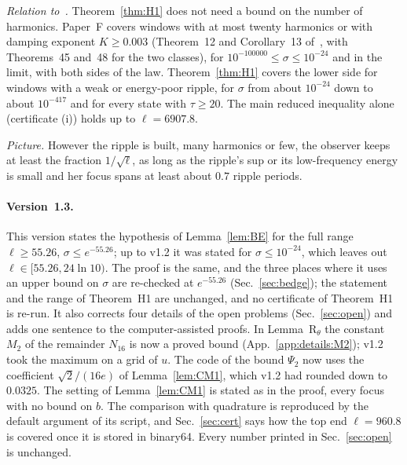 \emph{Relation to~\cite{F}.}
Theorem~\ref{thm:H1} does not need a bound on the number of harmonics.
Paper~F covers windows with at most twenty harmonics or with damping exponent $K\ge0.003$ (Theorem~12 and Corollary~13 of~\cite{F}, with Theorems~45 and~48 for the two classes), for $10^{-100000}\le\sigma\le10^{-24}$ and in the limit, with both sides of the law.
Theorem~\ref{thm:H1} covers the lower side for windows with a weak or energy-poor ripple, for $\sigma$ from about $10^{-24}$ down to about $10^{-417}$ and for every state with $\tau\ge20$.
The main reduced inequality alone (certificate (i)) holds up to $\ell=6907.8$.

\emph{Picture.} However the ripple is built, many harmonics or few, the observer keeps at least the fraction $1/\sqrt\ell$, as long as the ripple's sup or its low-frequency energy is small and her focus spans at least about $0.7$ ripple periods.

\paragraph*{Version~1.3.}
This version states the hypothesis of Lemma~\ref{lem:BE} for the full range $\ell\ge55.26$, $\sigma\le e^{-55.26}$; up to v1.2 it was stated for $\sigma\le10^{-24}$, which leaves out $\ell\in[55.26,24\ln10)$.
The proof is the same, and the three places where it uses an upper bound on $\sigma$ are re-checked at $e^{-55.26}$ (Sec.~\ref{sec:bedge}); the statement and the range of Theorem~H1 are unchanged, and no certificate of Theorem~H1 is re-run.
It also corrects four details of the open problems (Sec.~\ref{sec:open}) and adds one sentence to the computer-assisted proofs.
In Lemma~R$_\theta$ the constant $M_2$ of the remainder $N_{16}$ is now a proved bound (App.~\ref{app:details:M2}); v1.2 took the maximum on a grid of $u$.
The code of the bound $\Psi_2$ now uses the coefficient $\sqrt2/(16e)$ of Lemma~\ref{lem:CM1}, which v1.2 had rounded down to $0.0325$.
The setting of Lemma~\ref{lem:CM1} is stated as in the proof, every focus with no bound on $b$.
The comparison with quadrature is reproduced by the default argument of its script, and Sec.~\ref{sec:cert} says how the top end $\ell=960.8$ is covered once it is stored in binary64.
Every number printed in Sec.~\ref{sec:open} is unchanged.

